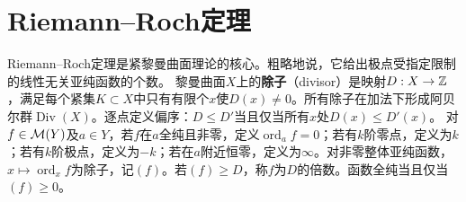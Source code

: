 \section{Riemann--Roch定理}
Riemann--Roch定理是紧黎曼曲面理论的核心。粗略地说，它给出极点受指定限制的线性无关亚纯函数的个数。
黎曼曲面$X$上的\textbf{除子}（divisor）是映射$D:X\to\mathbb Z$，满足每个紧集$K\subset X$中只有有限个$x$使$D(x)\ne0$。所有除子在加法下形成阿贝尔群$\operatorname{Div}(X)$。逐点定义偏序：$D\le D'$当且仅当所有$x$处$D(x)\le D'(x)$。
对$f\in\mathcal M(Y)$及$a\in Y$，若$f$在$a$全纯且非零，定义$\operatorname{ord}_a f=0$；若有$k$阶零点，定义为$k$；若有$k$阶极点，定义为$-k$；若在$a$附近恒零，定义为$\infty$。对非零整体亚纯函数，$x\mapsto\operatorname{ord}_xf$为除子，记$(f)$。若$(f)\ge D$，称$f$为$D$的倍数。函数全纯当且仅当$(f)\ge0$。

